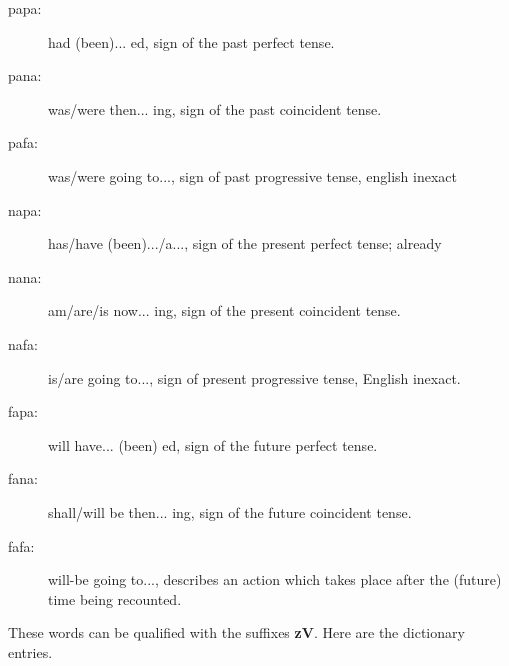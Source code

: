 \documentclass[12pt]{book}
\begin{document}
\begin{description}

\item[papa:]  had (been)... ed, sign of the past perfect tense.

\item[pana:]  was/were then... ing, sign of the past coincident tense.

\item[pafa:]  was/were going to..., sign of past progressive tense, english inexact

\item[napa:]  has/have (been).../a..., sign of the present perfect tense; already

\item[nana:]  am/are/is now... ing, sign of the present coincident tense.

\item[nafa:]  is/are going to..., sign of present progressive tense, English inexact.

\item[fapa:]  will have... (been) ed, sign of the future perfect tense.

\item[fana:]  shall/will be then... ing, sign of the future coincident tense.

\item[fafa:]  will-be going to..., describes an action which takes place after the (future) time being recounted.

\end{description}

These words can be qualified with the suffixes {\bf zV}.   Here are the dictionary entries.
\end{document}
